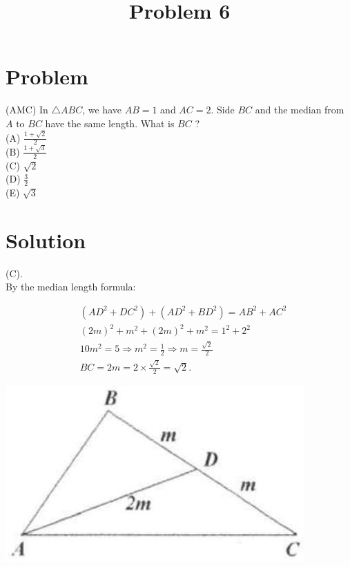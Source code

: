 \documentclass{article}
\title{Problem 6}
\date{}
\begin{document}
\maketitle

\section*{Problem}
(AMC) In \(\triangle A B C\), we have \(A B=1\) and \(A C=2\). Side \(B C\) and the median from \(A\) to \(B C\) have the same length. What is \(B C\) ?\\
(A) \(\frac{1+\sqrt{2}}{2}\)\\
(B) \(\frac{1+\sqrt{3}}{2}\)\\
(C) \(\sqrt{2}\)\\
(D) \(\frac{3}{2}\)\\
(E) \(\sqrt{3}\)

\section*{Solution}
(C).\\
By the median length formula:

\[
\begin{aligned}
& \left(A D^{2}+D C^{2}\right)+\left(A D^{2}+B D^{2}\right)=A B^{2}+A C^{2} \\
& (2 m)^{2}+m^{2}+(2 m)^{2}+m^{2}=1^{2}+2^{2} \\
& 10 m^{2}=5 \Rightarrow m^{2}=\frac{1}{2} \Rightarrow m=\frac{\sqrt{2}}{2} \\
& B C=2 m=2 \times \frac{\sqrt{2}}{2}=\sqrt{2} .
\end{aligned}
\]

\begin{center}
\includegraphics[width=\textwidth]{images/031(2).jpg}
\end{center}
\end{document}
